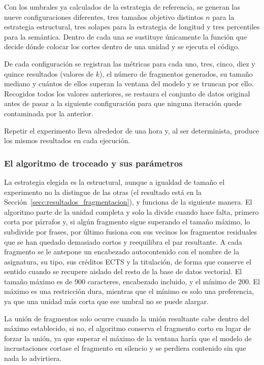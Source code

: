 Con los umbrales ya calculados de la estrategia de referencia, se generan las nueve configuraciones diferentes, tres tamaños objetivo distintos $n$ para la estrategia estructural, tres solapes para la estrategia de longitud y tres percentiles para la semántica. Dentro de cada una se sustituye únicamente la función que decide dónde colocar los cortes dentro de una unidad y se ejecuta el código. 

De cada configuración se registran las métricas para cada uno, tres, cinco, diez y quince resultados (valores de $k$), el número de fragmentos generados, su tamaño mediano y cuántos de ellos superan la ventana del modelo y se truncan por ello. Recogidos todos los valores anteriores, se restaura el conjunto de datos original antes de pasar a la siguiente configuración para que ninguna iteración quede contaminada por la anterior.

Repetir el experimento lleva alrededor de una hora y, al ser determinista, produce los mismos resultados en cada ejecución.


\subsubsection[El algoritmo de troceado y sus parámetros]{El algoritmo de troceado y sus parámetros}
\label{secc:troceado_algoritmo}

La estrategia elegida es la estructural, aunque a igualdad de tamaño el experimento no la distingue de las otras (el resultado está en la
  Sección~\ref{secc:resultados_fragmentacion}), y funciona de la siguiente manera. 
  El algoritmo parte de la unidad completa y solo la divide cuando hace
falta, primero corta por párrafos y, si algún fragmento sigue superando el tamaño máximo, lo subdivide por frases,
por último fusiona con sus vecinos los fragmentos residuales que se han quedado demasiado cortos y reequilibra el par resultante.
A cada fragmento se le antepone un encabezado autocontenido con el nombre de la asignatura, su tipo, sus créditos ECTS y
la titulación, de forma que conserve el sentido cuando se recupere aislado del resto de la base de datos vectorial. El tamaño máximo es de 900 caracteres, encabezado incluido, y el mínimo de 200. El máximo es una restricción dura, mientras que el mínimo es solo una preferencia,
ya que una unidad más corta que ese umbral no se puede alargar.


La unión de fragmentos solo ocurre cuando la unión resultante cabe dentro del máximo establecido, si no, el algoritmo conserva el fragmento corto en lugar de forzar la unión, ya que superar el máximo de la ventana haría que el modelo de incrustaciones cortase el fragmento en silencio y se perdiera contenido sin que nada lo advirtiera.


